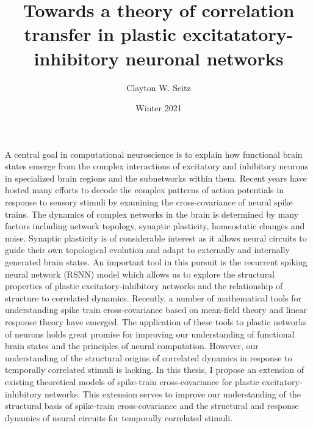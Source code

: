 \documentclass{ucetd}
\title{Towards a theory of correlation transfer in plastic excitatatory-inhibitory neuronal networks}
\author{Clayton W. Seitz}
\date{Winter 2021}
\begin{document}
\maketitle

\makecopyright
\makeepigraph


\tableofcontents

\acknowledgments

\abstract

A central goal in computational neuroscience is to explain how functional brain states emerge from the complex interactions of excitatory and inhibitory neurons in specialized brain regions and the subnetworks within them. Recent years have hosted many efforts to decode the complex patterns of action potentials in response to sensory stimuli by examining the cross-covariance of neural spike trains. The dynamics of complex networks in the brain is determined by many factors including network topology, synaptic plasticity, homeostatic changes and noise. Synaptic plasticity is of considerable interest as it allows neural circuits to guide their own topological evolution and adapt to externally and internally generated brain states. An important tool in this pursuit is the recurrent spiking neural network (RSNN) model which allows us to explore the structural properties of plastic excitatory-inhibitory networks and the relationship of structure to correlated dynamics. Recently, a number of mathematical tools for understanding spike train cross-covariance based on mean-field theory and linear response theory have emerged. The application of these tools to plastic networks of neurons holds great promise for improving our understanding of functional brain states and the principles of neural computation. However, our understanding of the structural origins of correlated dynamics in response to temporally correlated stimuli is lacking. In this thesis, I propose an extension of existing theoretical models of spike-train cross-covariance for plastic excitatory-inhibitory networks. This extension serves to improve our understanding of the structural basis of spike-train cross-covariance and the structural and response dynamics of neural circuits for temporally correlated stimuli.
\clearpage
\end{document}
